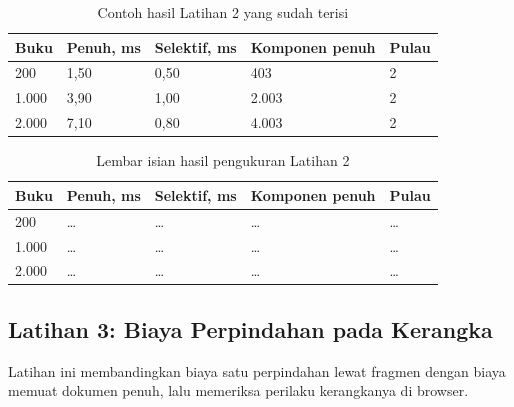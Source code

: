\begin{table}[!htb]
  \centering
  \caption{Contoh hasil Latihan 2 yang sudah terisi}
  \label{tab:c11-lat2-contoh}
  \begin{tabularx}{\textwidth}{Xllll}
    \hline
    \textbf{Buku} & \textbf{Penuh, ms} & \textbf{Selektif, ms} & \textbf{Komponen penuh} & \textbf{Pulau} \\
    \hline
    200 & 1,50 & 0,50 & 403 & 2 \\
    \hline
    1.000 & 3,90 & 1,00 & 2.003 & 2 \\
    \hline
    2.000 & 7,10 & 0,80 & 4.003 & 2 \\
    \hline
  \end{tabularx}
\end{table}

\begin{table}[!htb]
  \centering
  \caption{Lembar isian hasil pengukuran Latihan 2}
  \label{tab:c11-lat2-hasil}
  \begin{tabularx}{\textwidth}{Xllll}
    \hline
    \textbf{Buku} & \textbf{Penuh, ms} & \textbf{Selektif, ms} & \textbf{Komponen penuh} & \textbf{Pulau} \\
    \hline
    200 & \dots & \dots & \dots & \dots \\
    \hline
    1.000 & \dots & \dots & \dots & \dots \\
    \hline
    2.000 & \dots & \dots & \dots & \dots \\
    \hline
  \end{tabularx}
\end{table}

\subsection*{Latihan 3: Biaya Perpindahan pada Kerangka}

Latihan ini membandingkan biaya satu perpindahan lewat fragmen dengan biaya
memuat dokumen penuh, lalu memeriksa perilaku kerangkanya di browser.

